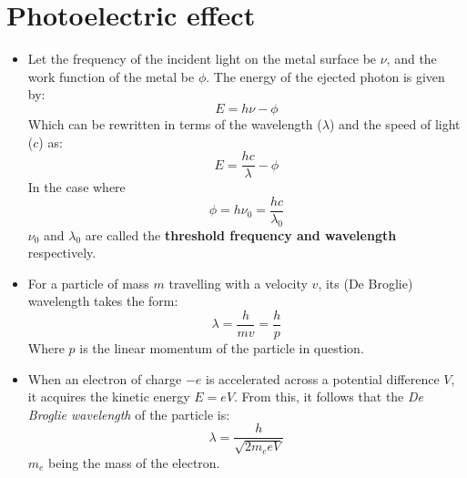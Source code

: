 \documentclass[a4paper]{article}
\begin{document}
\section{Photoelectric effect}
\begin{itemize}
    \item Let the frequency of the incident light on the metal surface be $\nu$, and the work function of the metal be $\phi$. The energy of the ejected photon is given by: 
    \begin{equation*}
        E = h\nu - \phi
    \end{equation*}
    Which can be rewritten in terms of the wavelength ($\lambda$) and the speed of light ($c$) as:
    \begin{equation*}
        E = \frac{hc}{\lambda} - \phi
    \end{equation*}
    In the case where 
    \begin{equation*}
        \phi = h\nu_0 = \frac{hc}{\lambda_0}
    \end{equation*}
    $\nu_0$ and $\lambda_0$ are called the \textbf{threshold frequency and wavelength} respectively.
    
    \item For a particle of mass $m$ travelling with a velocity $v$, its (De Broglie) wavelength takes the form:
    \begin{equation*}
        \lambda = \frac{h}{mv} = \frac{h}{p}
    \end{equation*}
    Where $p$ is the linear momentum of the particle in question.
    
    \item When an electron of charge $-e$ is accelerated across a potential difference $V$, it acquires the kinetic energy $E = eV$. From this, it follows that the \textit{De Broglie wavelength} of the particle is:
    \begin{equation*}
        \lambda = \frac{h}{\sqrt{2m_eeV}}
    \end{equation*}
    $m_e$ being the mass of the electron.
\end{itemize}
\end{document}
